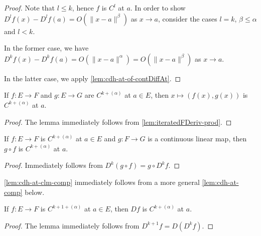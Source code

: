 \begin{proof}
  \leanok%
  Note that \(l\le k\), hence \(f\) is \(C^{l}\) at \(a\).
  In order to show \(D^{l}f(x) - D^{l}f(a) = O(\|x - a\|^{\beta})\) as \(x\to a\),
  consider the cases \(l = k\), \(\beta \le \alpha\) and \(l < k\).

  In the former case, we have \(D^{k}f(x) - D^{k}f(a) = O\left(\|x - a\|^{\alpha}\right)=O\left(\|x - a\|^{\beta}\right)\) as \(x\to a\).

  In the latter case, we apply \autoref{lem:cdh-at-of-contDiffAt}.
\end{proof}

\begin{lemma}%
  \label{lem:cdh-at-prodMk}
  \leanok%
  If \(f \colon E \to F\) and \(g \colon E \to G\) are \(C^{k+(\alpha)}\) at \(a \in E\),
  then \(x \mapsto (f(x), g(x))\) is \(C^{k+(\alpha)}\) at \(a\).
\end{lemma}
\begin{proof}
  \leanok%
  The lemma immediately follows from \autoref{lem:iteratedFDeriv-prod}.
\end{proof}

\begin{lemma}%
  \label{lem:cdh-at-clm-comp}
  \leanok%
  If \(f \colon E \to F\) is \(C^{k+(\alpha)}\) at \(a \in E\)
  and \(g \colon F \to G\) is a continuous linear map,
  then \(g \circ f\) is \(C^{k+(\alpha)}\) at \(a\).
\end{lemma}

\begin{proof}
  \leanok%
  Immediately follows from \(D^{k}(g \circ f) = g\circ D^{k}f\).
\end{proof}

\begin{remark}
  \autoref{lem:cdh-at-clm-comp} immediately follows from a more general \autoref{lem:cdh-at-comp} below.
\end{remark}

\begin{lemma}%
  \label{lem:cdh-at-fderiv}
  \leanok%
  If \(f \colon E \to F\) is \(C^{k+1+(\alpha)}\) at \(a \in E\),
  then \(Df\) is \(C^{k+(\alpha)}\) at \(a\).
\end{lemma}

\begin{proof}
  \leanok%
  The lemma immediately follows from \(D^{k+1}f = D(D^{k}f)\).
\end{proof}

